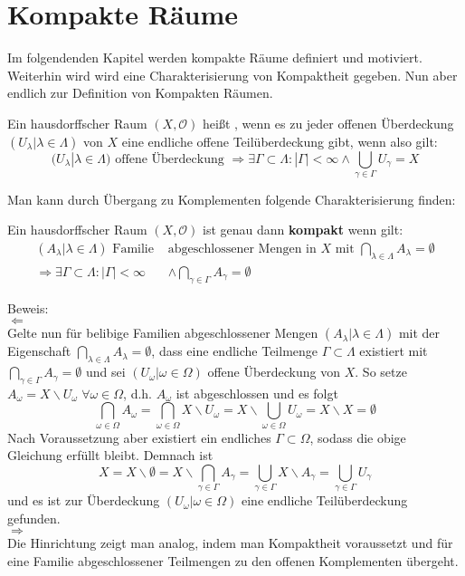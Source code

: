 \chapter{Kompakte Räume}
Im folgendenden Kapitel werden kompakte Räume definiert und motiviert. Weiterhin wird 
wird eine Charakterisierung von Kompaktheit gegeben.
Nun aber endlich zur Definition von Kompakten Räumen.

\begin{Def}[Kompaktheit]
	Ein hausdorffscher Raum \((X, \mathcal{O})\) heißt , wenn es zu jeder offenen Überdeckung 
	\((U_{\lambda} | \lambda \in \Lambda)\) von \(X\) eine endliche offene Teilüberdeckung gibt, wenn also gilt:
	\[ (U_{\lambda} | \lambda \in \Lambda) \mbox{ offene Überdeckung }
     \Rightarrow \exists \Gamma \subset \Lambda : |\Gamma| < \infty \land \bigcup_{\gamma \in \Gamma} U_{\gamma} = X \] 
\end{Def}
Man kann durch Übergang zu Komplementen folgende Charakterisierung finden:

\begin{Satz}
	Ein hausdorffscher Raum \((X, \mathcal{O})\) ist genau dann \textbf{kompakt} wenn gilt:
	\begin{align*}
		(A_{\lambda}| \lambda \in \Lambda) \mbox{ Familie } & \mbox{abgeschlossener Mengen in } X \mbox{ mit } 
		\bigcap_{\lambda \in \Lambda} A_{\lambda} = \emptyset \\
		\Rightarrow \exists \Gamma \subset \Lambda : |\Gamma| < \infty & \land \bigcap_{\gamma \in \Gamma} A_{\gamma} = \emptyset
	\end{align*} 
\end{Satz}
Beweis:
\\
\glqq\(\Leftarrow\)\grqq
\\
Gelte nun für belibige Familien abgeschlossener Mengen \((A_{\lambda}| \lambda \in \Lambda)\) mit der Eigenschaft
\(\bigcap_{\lambda \in \Lambda} A_{\lambda} = \emptyset\), dass eine endliche Teilmenge \(\Gamma \subset \Lambda\) existiert mit
\(\bigcap_{\gamma \in \Gamma} A_{\gamma} = \emptyset\) und sei \( (U_{\omega} | \omega \in \Omega) \) offene Überdeckung
von \(X\). So setze \(A_{\omega} = X \backslash U_{\omega} \; \forall \omega \in \Omega\), d.h. \(A_{\omega}\) ist abgeschlossen
und es folgt 
\[\bigcap_{\omega \in \Omega} A_{\omega} = \bigcap_{\omega \in \Omega} X \backslash U_{\omega} =  X \backslash 
\bigcup_{\omega \in \Omega} U_{\omega} = X \backslash X =  \emptyset \]
Nach Voraussetzung aber existiert ein endliches \(\Gamma \subset \Omega\), sodass die obige Gleichung erfüllt bleibt. Demnach ist 
\[ X = X \backslash \emptyset = X \backslash \bigcap_{\gamma \in \Gamma} A_{\gamma} = \bigcup_{\gamma \in \Gamma} X \backslash A_{\gamma} = 
\bigcup_{\gamma \in \Gamma} U_{\gamma} \] 
und es ist zur Überdeckung \( (U_{\omega} | \omega \in \Omega) \) eine endliche Teilüberdeckung gefunden.
\\
\glqq\(\Rightarrow\)\grqq
\\
Die Hinrichtung zeigt man analog, indem man Kompaktheit voraussetzt und für eine Familie abgeschlossener Teilmengen zu den 
offenen Komplementen übergeht.

